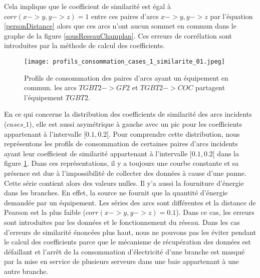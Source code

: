 	Cela implique que le coefficient de similarit\'e est \'egal \`a $corr(x->y,y->z) = 1$ entre ces paires d'arcs $x->y,y->z$ par l'\'equation \ref{personDistance} alors que ces arcs n'ont aucun sommet en commun dans le graphe de la figure \ref{sousReseauChamplan}.
	Ces erreurs de corr\'elation sont introduites par la m\'ethode de calcul des coefficients.
	\newline  
		\begin{figure}[htb!] 
		\centering
		\texttt{[image: profils\_consommation\_cases\_1\_similarite\_01.jpeg]}
		\caption{ Profils de consommation des paires d'arcs ayant un \'equipement en commun. 
		les arcs $TGBT2->GF2$ et $TGBT2->COC$ partagent l'\'equipement $TGBT2$.}
		\label{profils_consommation_cases_1_similarite_01}
		\end{figure}
	En ce qui concerne la distribution des coefficients de similarit\'e des arcs incidents ($cases\_1$), elle est aussi asym\'etrique \`a gauche avec un pic  pour les coefficients appartenant \`a l'intervalle $[0.1,0.2[$. Pour comprendre cette distribution, nous repr\'esentons les profils de consommation de certaines paires d'arcs incidents  ayant leur coefficient de similarit\'e appartenant \`a  l'intervalle $[0.1,0.2[$ dans la figure \ref{profils_consommation_cases_1_similarite_01}.  
	Dans ces repr\'esentations, il y a toujours une courbe constante et sa pr\'esence est due \`a l'impossibilit\'e de collecter des donn\'ees \`a cause d'une panne. 
	Cette s\'erie contient alors des valeurs nulles. Il y'a aussi la fourniture d'\'energie dans les branches. En effet, la source ne fournit que la quantit\'e d'\'energie demand\'ee par un \'equipement. Les s\'eries des arcs sont diff\'erentes et la distance de Pearson est la plus faible ($corr(x->y,y->z) = 0.1$). 
	Dans ce cas, les erreurs sont introduites par les donn\'ees et le fonctionnement du r\'eseau.
\newline	
Dans les cas d'erreurs de similarit\'e \'enonc\'ees plus haut, nous ne pouvons pas les \'eviter  pendant le calcul des coefficients parce que le m\'ecanisme de r\'ecup\'eration des donn\'ees est d\'efaillant et  l'arr\^et de la consommation d'\'electricit\'e d'une branche est masqu\'e par la mise en service de plusieurs serveurs dans une baie appartenant \`a une autre branche.
\newline 

